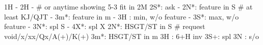 1H - 2H -  # or anytime showing 5-3 fit in 2M
2S*: ask
   - 2N*: feature in S  # at least KJ/QJT
   - 3m*: feature in m
   - 3H : min, w/o feature
   - 3S*: max, w/o feature
   - 3N*: spl S
   - 4X*: spl X
2N*: HSGT/ST in S  # request void/x/xx/Qx/A(+)/K(+)
3m*: HSGT/ST in m  
3H : 6+H inv
3S+: spl
3N : s/o
